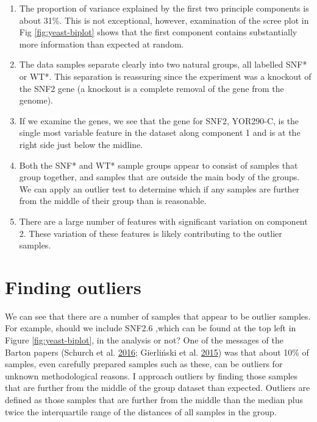 \documentclass[onecolumn]{book}
\providecommand{\tightlist}{%
  \setlength{\itemsep}{0pt}\setlength{\parskip}{0pt}}
\theoremstyle{definition}
\theoremstyle{definition}
\theoremstyle{definition}
\theoremstyle{remark}
\begin{document}
\begin{enumerate}
\def\labelenumi{\arabic{enumi})}
\tightlist
\item
  The proportion of variance explained by the first two principle
  components is about 31\%. This is not exceptional, however,
  examination of the scree plot in Fig \ref{fig:yeast-biplot} shows that
  the first component contains substantially more information than
  expected at random.
\item
  The data samples separate clearly into two natural groups, all
  labelled SNF* or WT*. This separation is reassuring since the
  experiment was a knockout of the SNF2 gene (a knockout is a complete
  removal of the gene from the genome).
\item
  If we examine the genes, we see that the gene for SNF2, YOR290-C, is
  the single most variable feature in the dataset along component 1 and
  is at the right side just below the midline.
\item
  Both the SNF* and WT* sample groups appear to consist of samples that
  group together, and samples that are outside the main body of the
  groups. We can apply an outlier test to determine which if any samples
  are further from the middle of their group than is reasonable.
\item
  There are a large number of features with significant variation on
  component 2. These variation of these features is likely contributing
  to the outlier samples.
\end{enumerate}

\hypertarget{finding-outliers}{%
\section{Finding outliers}\label{finding-outliers}}

We can see that there are a number of samples that appear to be outlier
samples. For example, should we include SNF2.6 ,which can be found at
the top left in Figure \ref{fig:yeast-biplot}, in the analysis or not?
One of the messages of the Barton papers (Schurch et al.
\protect\hyperlink{ref-Schurch:2016aa}{2016}; Gierliński et al.
\protect\hyperlink{ref-Gierlinski:2015aa}{2015}) was that about 10\% of
samples, even carefully prepared samples such as these, can be outliers
for unknown methodological reasons. I approach outliers by finding those
samples that are further from the middle of the group dataset than
expected. Outliers are defined as those samples that are further from
the middle than the median plus twice the interquartile range of the
distances of all samples in the group.
\end{document}
